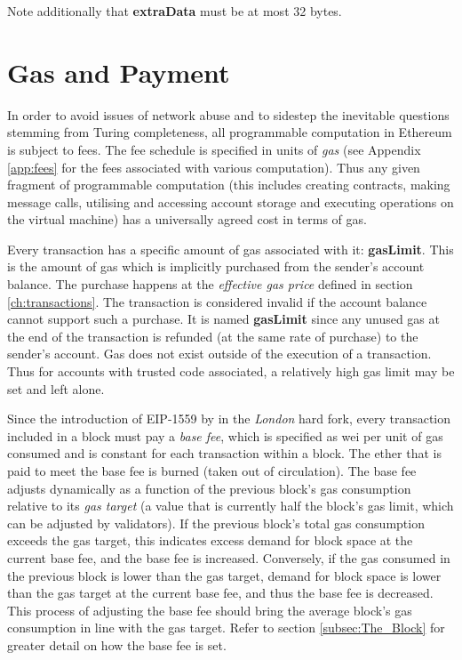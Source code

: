 \documentclass[9pt,oneside]{amsart}
\begin{document}
\begin{multicols}{2}
Note additionally that \textbf{extraData} must be at most 32 bytes.

\section{Gas and Payment} \label{ch:payment}

In order to avoid issues of network abuse and to sidestep the inevitable questions stemming from Turing completeness, all programmable computation in Ethereum is subject to fees. The fee schedule is specified in units of \textit{gas} (see Appendix \ref{app:fees} for the fees associated with various computation). Thus any given fragment of programmable computation (this includes creating contracts, making message calls, utilising and accessing account storage and executing operations on the virtual machine) has a universally agreed cost in terms of gas.

Every transaction has a specific amount of gas associated with it: \textbf{gasLimit}. This is the amount of gas which is implicitly purchased from the sender's account balance. The purchase happens at the \textit{effective gas price} defined in section \ref{ch:transactions}. The transaction is considered invalid if the account balance cannot support such a purchase. It is named \textbf{gasLimit} since any unused gas at the end of the transaction is refunded (at the same rate of purchase) to the sender's account. Gas does not exist outside of the execution of a transaction. Thus for accounts with trusted code associated, a relatively high gas limit may be set and left alone.

Since the introduction of EIP-1559 by \cite{EIP-1559} in the \textit{London} hard fork, every transaction included in a block must pay a \textit{base fee}, which is specified as wei per unit of gas consumed and is constant for each transaction within a block. The ether that is paid to meet the base fee is burned (taken out of circulation). The base fee adjusts dynamically as a function of the previous block's gas consumption relative to its \textit{gas target} (a value that is currently half the block's gas limit, which can be adjusted by validators). If the previous block's total gas consumption exceeds the gas target, this indicates excess demand for block space at the current base fee, and the base fee is increased. Conversely, if the gas consumed in the previous block is lower than the gas target, demand for block space is lower than the gas target at the current base fee, and thus the base fee is decreased. This process of adjusting the base fee should bring the average block's gas consumption in line with the gas target. Refer to section \ref{subsec:The_Block} for greater detail on how the base fee is set.


\end{multicols}
\end{document}

